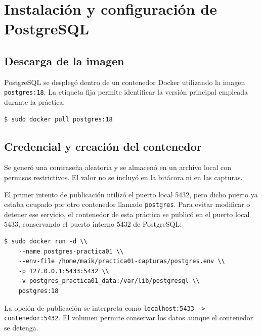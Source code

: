 \section{Instalación y configuración de PostgreSQL}

\subsection{Descarga de la imagen}

PostgreSQL se desplegó dentro de un contenedor Docker utilizando la imagen
\texttt{postgres:18}. La etiqueta fija permite identificar la versión principal
empleada durante la práctica.

\begin{lstlisting}[style=terminal]
$ sudo docker pull postgres:18
\end{lstlisting}

\subsection{Credencial y creación del contenedor}

Se generó una contraseña aleatoria y se almacenó en un archivo local con
permisos restrictivos. El valor no se incluyó en la bitácora ni en las
capturas.

El primer intento de publicación utilizó el puerto local 5432, pero dicho
puerto ya estaba ocupado por otro contenedor llamado \texttt{postgres}. Para
evitar modificar o detener ese servicio, el contenedor de esta práctica se
publicó en el puerto local 5433, conservando el puerto interno 5432 de
PostgreSQL:

\begin{lstlisting}[style=terminal]
$ sudo docker run -d \\
    --name postgres-practica01 \\
    --env-file /home/maik/practica01-capturas/postgres.env \\
    -p 127.0.0.1:5433:5432 \\
    -v postgres_practica01_data:/var/lib/postgresql \\
    postgres:18
\end{lstlisting}

La opción de publicación se interpreta como
\texttt{localhost:5433 -> contenedor:5432}. El volumen permite conservar los
datos aunque el contenedor se detenga.


